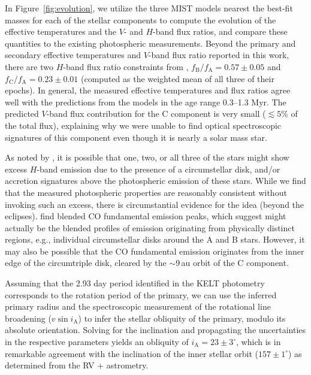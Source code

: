 \documentclass[twocolumn]{aastex61}
\begin{document}
In Figure~\ref{fig:evolution}, we utilize the three MIST models nearest the best-fit masses for each of the stellar components to compute the evolution of the effective temperatures and the $V$- and $H$-band flux ratios, and compare these quantities to the existing photospheric measurements. Beyond the primary and secondary effective temperatures and $V$-band flux ratio reported in this work, there are two $H$-band flux ratio constraints from \citet{berger11},  $f_\mathrm{B}/f_\mathrm{A} = 0.57 \pm 0.05$ and $f_\mathrm{C}/f_\mathrm{A} = 0.23 \pm 0.01$ (computed as the weighted mean of all three of their epochs). In general, the measured effective temperatures and flux ratios agree well with the predictions from the models in the age range 0.3--1.3 Myr.
The predicted $V$-band flux contribution for the C component is very small ($\lesssim 5\%$ of the total flux), explaining why we were unable to find optical spectroscopic signatures of this component even though it is nearly a solar mass star.

As noted by \citet{berger11}, it is possible that one, two, or all three of the stars might show excess $H$-band emission due to the presence of a circumstellar disk, and/or accretion signatures above the photospheric emission of these stars. While we find that the measured photospheric properties are reasonably consistent without invoking such an excess, there is circumstantial evidence for the idea (beyond the eclipses). \citet{najita03} find blended CO fundamental emission peaks, which \citet{bast11} suggest might actually be the blended profiles of emission originating from physically distinct regions, e.g., individual circumstellar disks around the A and B stars. However, it may also be possible that the CO fundamental emission originates from the inner edge of the circumtriple disk, cleared by the $\sim$9\,au orbit of the C component.

Assuming that the 2.93 day period identified in the KELT photometry corresponds to the rotation period of the primary, we can use the inferred primary radius and the spectroscopic measurement of the rotational line broadening ($v \sin i_\mathrm{A}$) to infer the stellar obliquity of the primary, modulo its absolute orientation. Solving for the inclination and propagating the uncertainties in the respective parameters yields an obliquity of $i_\mathrm{A} = 23 \pm 3^\circ$, which is in remarkable agreement with the inclination of the inner stellar orbit ($157 \pm 1^\circ$) as determined from the RV + astrometry.
\end{document}
